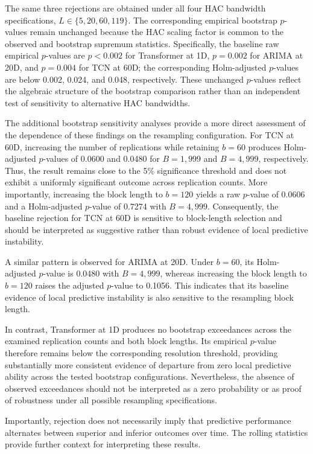 \documentclass[runningheads,orivec]{llncs}
\begin{document}
The same three rejections are obtained under all four HAC bandwidth specifications, $L\in\{5,20,60,119\}$. The corresponding empirical bootstrap $p$-values remain unchanged because the HAC scaling factor is common to the observed and bootstrap supremum statistics. Specifically, the baseline raw empirical $p$-values are $p<0.002$ for Transformer at 1D, $p=0.002$ for ARIMA at 20D, and $p=0.004$ for TCN at 60D; the corresponding Holm-adjusted $p$-values are below 0.002, 0.024, and 0.048, respectively. These unchanged $p$-values reflect the algebraic structure of the bootstrap comparison rather than an independent test of sensitivity to alternative HAC bandwidths.

The additional bootstrap sensitivity analyses provide a more direct assessment of the dependence of these findings on the resampling configuration. For TCN at 60D, increasing the number of replications while retaining $b=60$ produces Holm-adjusted $p$-values of 0.0600 and 0.0480 for $B=1,999$ and $B=4,999$, respectively. Thus, the result remains close to the 5\% significance threshold and does not exhibit a uniformly significant outcome across replication counts. More importantly, increasing the block length to $b=120$ yields a raw $p$-value of 0.0606 and a Holm-adjusted $p$-value of 0.7274 with $B=4,999$. Consequently, the baseline rejection for TCN at 60D is sensitive to block-length selection and should be interpreted as suggestive rather than robust evidence of local predictive instability.

A similar pattern is observed for ARIMA at 20D. Under $b=60$, its Holm-adjusted $p$-value is 0.0480 with $B=4,999$, whereas increasing the block length to $b=120$ raises the adjusted $p$-value to 0.1056. This indicates that its baseline evidence of local predictive instability is also sensitive to the resampling block length.

In contrast, Transformer at 1D produces no bootstrap exceedances across the examined replication counts and both block lengths. Its empirical $p$-value therefore remains below the corresponding resolution threshold, providing substantially more consistent evidence of departure from zero local predictive ability across the tested bootstrap configurations. Nevertheless, the absence of observed exceedances should not be interpreted as a zero probability or as proof of robustness under all possible resampling specifications.

Importantly, rejection does not necessarily imply that predictive performance alternates between superior and inferior outcomes over time. The rolling statistics provide further context for interpreting these results.
\end{document}

